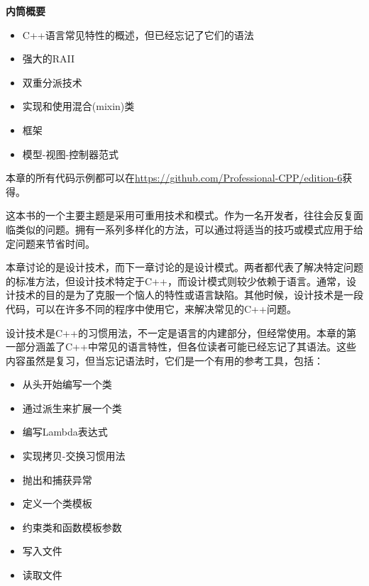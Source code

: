 \noindent
\textbf{内筒概要}

\begin{itemize}
\item
C++语言常见特性的概述，但已经忘记了它们的语法

\item
强大的RAII

\item
双重分派技术

\item
实现和使用混合(mixin)类

\item
框架

\item
模型-视图-控制器范式
\end{itemize}

本章的所有代码示例都可以在\url{https://github.com/Professional-CPP/edition-6}获得。

这本书的一个主要主题是采用可重用技术和模式。作为一名开发者，往往会反复面临类似的问题。拥有一系列多样化的方法，可以通过将适当的技巧或模式应用于给定问题来节省时间。

本章讨论的是设计技术，而下一章讨论的是设计模式。两者都代表了解决特定问题的标准方法，但设计技术特定于C++，而设计模式则较少依赖于语言。通常，设计技术的目的是为了克服一个恼人的特性或语言缺陷。其他时候，设计技术是一段代码，可以在许多不同的程序中使用它，来解决常见的C++问题。

设计技术是C++的习惯用法，不一定是语言的内建部分，但经常使用。本章的第一部分涵盖了C++中常见的语言特性，但各位读者可能已经忘记了其语法。这些内容虽然是复习，但当忘记语法时，它们是一个有用的参考工具，包括：

\begin{itemize}
\item
从头开始编写一个类

\item
通过派生来扩展一个类

\item
编写Lambda表达式

\item
实现拷贝-交换习惯用法

\item
抛出和捕获异常

\item
定义一个类模板

\item
约束类和函数模板参数

\item
写入文件

\item
读取文件
\end{itemize}

